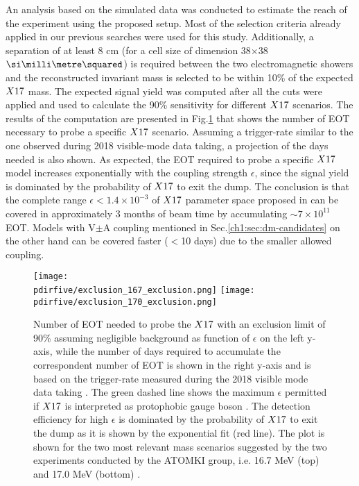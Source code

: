 An analysis based on the simulated data was conducted to estimate the reach of the experiment using the proposed setup. Most of the selection criteria already applied in our previous searches were used for this study. Additionally, a separation of at least 8 cm (for a cell size of dimension 38$\times$38 $\mms$) is required between the two electromagnetic showers and the reconstructed invariant mass is selected to be within 10\% of the expected $X17$ mass. The expected signal yield was computed after all the cuts were applied and used to calculate the 90\% sensitivity for different $X17$ scenarios. The results of the computation are presented in Fig.\ref{fig:exclusion-x17} that shows the number of EOT necessary to probe a specific $X17$ scenario. Assuming a trigger-rate similar to the one observed during 2018 visible-mode data taking, a projection of the days needed is also shown. As expected, the EOT required to probe a specific $X17$ model increases exponentially with the coupling strength $\epsilon$, since the signal yield is dominated by the probability of $X17$ to exit the dump. The conclusion is that the complete range $\epsilon < 1.4 \times 10^{-3}$ of $X17$ parameter space proposed in \cite{PhysRevD.95.035017} can be covered in approximately 3 months of beam time by accumulating $\sim 7 \times 10^{11}$ EOT. Models with V$\pm$A coupling mentioned in Sec.\ref{ch1:sec:dm-candidates} on the other hand can be covered faster ($<$10 days) due to the smaller allowed coupling. 

\begin{figure}[htb!]
  \centering
  \texttt{[image: \\pdirfive/exclusion\_167\_exclusion.png]}
  \texttt{[image: \\pdirfive/exclusion\_170\_exclusion.png]}
  \caption[EOT to X17 exclusion]{Number of EOT needed to probe the $X17$ with an exclusion limit of 90\% assuming negligible background as function of $\epsilon$ on the left y-axis, while the number of days required to accumulate the correspondent number of EOT is shown in the right y-axis and is based on the trigger-rate measured during the 2018 visible mode data taking \cite{Banerjee:2019hmi}. The green dashed line shows the maximum $\epsilon$ permitted if $X17$ is interpreted as protophobic gauge boson \cite{PhysRevD.95.035017}. The detection efficiency for high $\epsilon$ is dominated by the probability of $X17$ to exit the dump as it is shown by the exponential fit (red line). The plot is shown for the two most relevant mass scenarios suggested by the two experiments conducted by the ATOMKI group, i.e. 16.7 MeV (top) and 17.0 MeV (bottom) \cite{Krasznahorkay:2015iga,Krasznahorkay:2019lyl}.}
  \label{fig:exclusion-x17}
\end{figure}
  

